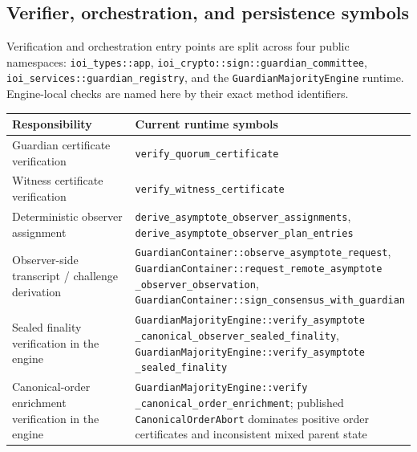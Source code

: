 \documentclass[11pt]{article}
\newcommand{\code}[1]{\texttt{#1}}
\begin{document}
\subsection{Verifier, orchestration, and persistence symbols}

Verification and orchestration entry points are split across four public
namespaces: \code{ioi\_types::app},
\code{ioi\_crypto::sign::guardian\_committee},
\code{ioi\_services::guardian\_registry}, and the
\code{GuardianMajorityEngine} runtime. Engine-local checks are named here by
their exact method identifiers.

\begin{center}
\scriptsize
\begin{tabularx}{\textwidth}{>{\raggedright\arraybackslash}p{} X}
\toprule
\textbf{Responsibility} & \textbf{Current runtime symbols} \\
\midrule
Guardian certificate verification & \code{verify\_quorum\_certificate} \\
Witness certificate verification & \code{verify\_witness\_certificate} \\
Deterministic observer assignment & \shortstack[l]{\code{derive\_asymptote\_observer\_assignments},\\\code{derive\_asymptote\_observer\_plan\_entries}} \\
Observer-side transcript / challenge derivation & \shortstack[l]{\code{GuardianContainer::observe\_asymptote\_request},\\\code{GuardianContainer::request\_remote\_asymptote}\\\code{\_observer\_observation},\\\code{GuardianContainer::sign\_consensus\_with\_guardian}} \\
Sealed finality verification in the engine & \shortstack[l]{\code{GuardianMajorityEngine::verify\_asymptote}\\\code{\_canonical\_observer\_sealed\_finality},\\\code{GuardianMajorityEngine::verify\_asymptote}\\\code{\_sealed\_finality}} \\
Canonical-order enrichment verification in the engine & \shortstack[l]{\code{GuardianMajorityEngine::verify}\\\code{\_canonical\_order\_enrichment}; published\\\code{CanonicalOrderAbort} dominates positive order\\certificates and inconsistent mixed parent state} \\

\end{tabularx}
\end{center}
\end{document}
